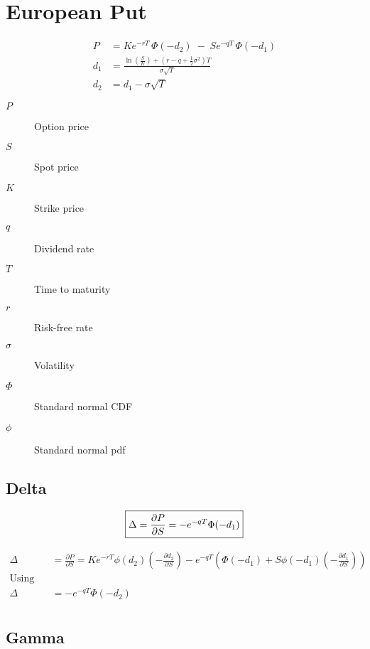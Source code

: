 \documentclass[12pt,a4paper]{article}
\begin{document}
\newpage

\section{European Put}

\[
  \begin{aligned}
    P   & = K e^{-rT}\,\Phi(-d_2) \;-\; S e^{-qT}\,\Phi(-d_1) \\
    d_1 & = \frac{\ln\!\left(\tfrac{S}{K}\right) + (r - q + \tfrac{1}{2}\sigma^2)T}{\sigma \sqrt{T}} \\
    d_2 & = d_1 - \sigma \sqrt{T}
  \end{aligned}
\]

\begin{description}
  \item[$P$] Option price
  \item[$S$] Spot price
  \item[$K$] Strike price
  \item[$q$] Dividend rate
  \item[$T$] Time to maturity
  \item[$r$] Risk-free rate
  \item[$\sigma$] Volatility
  \item[$\Phi$] Standard normal CDF
  \item[$\phi$] Standard normal pdf
\end{description}

\subsection{Delta}

\[
  \boxed{\Delta = \frac{\partial P}{\partial S} = -e^{-qT}\Phi(-d_1)} \\
\]

\[
  \begin{aligned}
    \Delta & = \frac{\partial P}{\partial S} = Ke^{-rT}\phi(d_2)\left(-\frac{\partial d_2}{\partial S}\right) - e^{-qT}\left(\Phi(-d_1) + S\phi(-d_1)\left(-\frac{\partial d_1}{\partial S}\right)\right) \\
    \text{Using Black-Scholes identity} \\
    \Delta & = -e^{-qT}\Phi(-d_2) \\
  \end{aligned}
\]

\subsection{Gamma}
\end{document}
